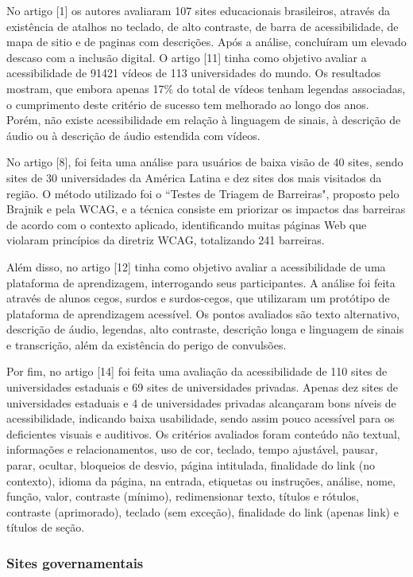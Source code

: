 \documentclass[a4paper]{article}
\begin{document}
\begin{titlepage}
No artigo [1] os autores avaliaram 107 sites educacionais brasileiros, através da existência de atalhos no teclado, de alto contraste, de barra de acessibilidade, de mapa de sitio e de paginas com descrições. Após a análise, concluíram um elevado descaso com a inclusão digital. O artigo [11] tinha como objetivo avaliar a acessibilidade de 91421 vídeos de 113 universidades do mundo. Os resultados mostram, que embora apenas 17\% do total de vídeos tenham legendas associadas, o cumprimento deste critério de sucesso tem melhorado ao longo dos anos. Porém, não existe acessibilidade em relação à linguagem de sinais, à descrição de áudio ou à descrição de áudio estendida com vídeos.

No artigo [8], foi feita uma análise para usuários de baixa visão de 40 sites, sendo sites de 30 universidades da América Latina e dez sites dos mais visitados da região. O método utilizado foi o ``Testes de Triagem de Barreiras", proposto pelo Brajnik e pela WCAG, e a técnica consiste em priorizar os impactos das barreiras de acordo com o contexto aplicado, identificando muitas páginas Web que violaram princípios da diretriz WCAG, totalizando 241 barreiras.

Além disso, no artigo [12] tinha como objetivo avaliar a acessibilidade de uma plataforma de aprendizagem, interrogando seus participantes. A análise foi feita através de alunos cegos, surdos e surdos-cegos, que utilizaram um protótipo de plataforma de aprendizagem acessível. Os pontos avaliados são texto alternativo, descrição de áudio, legendas, alto contraste, descrição longa e linguagem de sinais e transcrição, além da existência do perigo de convulsões. 

Por fim, no artigo [14] foi feita uma avaliação da acessibilidade de 110 sites de universidades estaduais e 69 sites de universidades privadas. Apenas dez sites de universidades estaduais e 4 de universidades privadas alcançaram bons níveis de acessibilidade, indicando baixa usabilidade, sendo assim pouco acessível para os deficientes visuais e auditivos. Os critérios avaliados foram conteúdo não textual, informações e relacionamentos, uso de cor, teclado, tempo ajustável, pausar, parar, ocultar, bloqueios de desvio, página intitulada, finalidade do link (no contexto), idioma da página, na entrada, etiquetas ou instruções, análise, nome, função, valor, contraste (mínimo), redimensionar texto, títulos e rótulos, contraste (aprimorado), teclado (sem exceção), finalidade do link (apenas link) e títulos de seção.

\subsubsection{Sites governamentais}


\end{titlepage}
\end{document}
